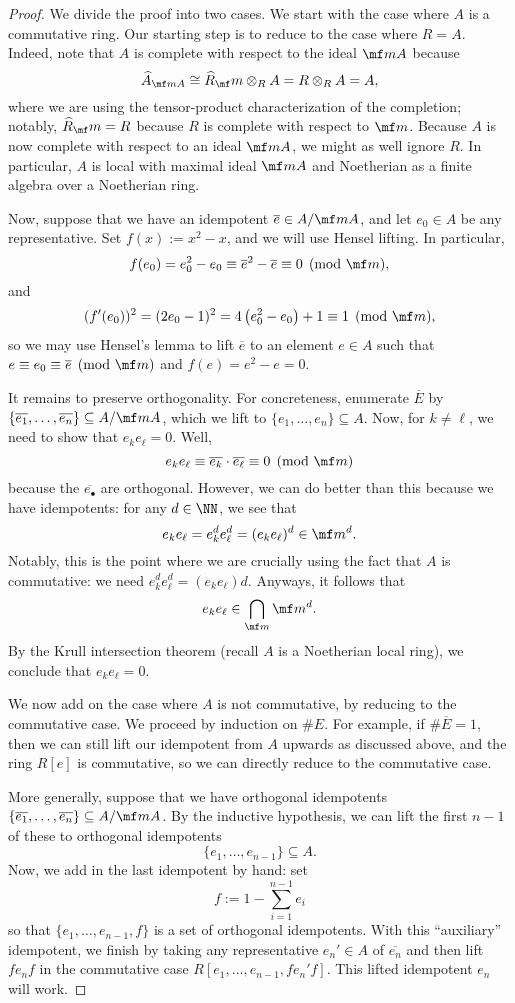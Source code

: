 \begin{proof}
	We divide the proof into two cases. We start with the case where $A$ is a commutative ring. Our starting step is to reduce to the case where $R=A$. Indeed, note that $A$ is complete with respect to the ideal $\mf mA$ because
	\[\widehat A_{\mf mA}\cong\widehat R_\mf m\otimes_RA=R\otimes_RA=A,\]
	where we are using the tensor-product characterization of the completion; notably, $\widehat R_\mf m=R$ because $R$ is complete with respect to $\mf m$. Because $A$ is now complete with respect to an ideal $\mf mA$, we might as well ignore $R$. In particular, $A$ is local with maximal ideal $\mf mA$ and Noetherian as a finite algebra over a Noetherian ring.

	Now, suppose that we have an idempotent $\overline e\in A/\mf mA$, and let $e_0\in A$ be any representative. Set $f(x):=x^2-x$, and we will use Hensel lifting. In particular,
	\[f(e_0)=e_0^2-e_0\equiv\overline e^2-\overline e\equiv0\pmod{\mf m},\]
	and
	\[(f'(e_0))^2=(2e_0-1)^2=4\left(e_0^2-e_0\right)+1\equiv1\pmod{\mf m},\]
	so we may use Hensel's lemma to lift $\overline e$ to an element $e\in A$ such that $e\equiv e_0\equiv\overline e\pmod{\mf m}$ and $f(e)=e^2-e=0$.

	It remains to preserve orthogonality. For concreteness, enumerate $\overline E$ by $\{\overline{e_1},\ldots,\overline{e_n}\}\subseteq A/\mf mA$, which we lift to $\{e_1,\ldots,e_n\}\subseteq A$. Now, for $k\ne\ell$, we need to show that $e_ke_\ell=0$. Well,
	\[e_ke_\ell\equiv\overline{e_k}\cdot\overline{e_\ell}\equiv0\pmod{\mf m}\]
	because the $\overline{e_\bullet}$ are orthogonal. However, we can do better than this because we have idempotents: for any $d\in\NN$, we see that
	\[e_ke_\ell=e_k^de_\ell^d=(e_ke_\ell)^d\in\mf m^d.\]
	Notably, this is the point where we are crucially using the fact that $A$ is commutative: we need $e_k^de_\ell^d=(e_ke_\ell)d$. Anyways, it follows that
	\[e_ke_\ell\in\bigcap_{\mf m}\mf m^d.\]
	By the Krull intersection theorem (recall $A$ is a Noetherian local ring), we conclude that $e_ke_\ell=0$.

	We now add on the case where $A$ is not commutative, by reducing to the commutative case. We proceed by induction on $\#E$. For example, if $\#\overline E=1$, then we can still lift our idempotent from $A$ upwards as discussed above, and the ring $R[e]$ is commutative, so we can directly reduce to the commutative case.

	More generally, suppose that we have orthogonal idempotents $\{\overline{e_1},\ldots,\overline{e_n}\}\subseteq A/\mf mA$. By the inductive hypothesis, we can lift the first $n-1$ of these to orthogonal idempotents
	\[\{e_1,\ldots,e_{n-1}\}\subseteq A.\]
	Now, we add in the last idempotent by hand: set
	\[f:=1-\sum_{i=1}^{n-1}e_i\]
	so that $\{e_1,\ldots,e_{n-1},f\}$ is a set of orthogonal idempotents. With this ``auxiliary'' idempotent, we finish by taking any representative $e_n'\in A$ of $\overline{e_n}$ and then lift $fe_nf$ in the commutative case $R[e_1,\ldots,e_{n-1},fe_n'f]$. This lifted idempotent $e_n$ will work. %
\end{proof}
